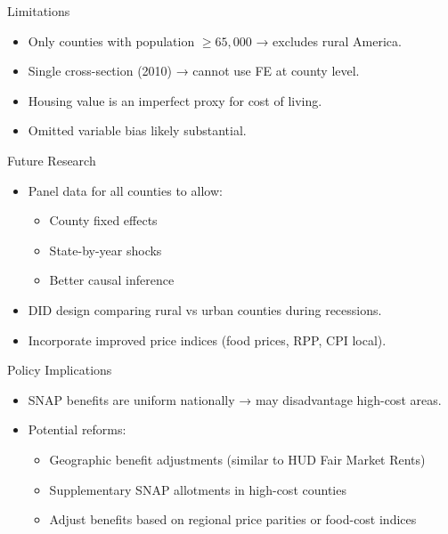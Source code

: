 \documentclass{beamer}
\begin{document}
\begin{frame}{Limitations}
\begin{itemize}
    \item Only counties with population $\geq 65,000$ → excludes rural America.
    \item Single cross-section (2010) → cannot use FE at county level.
    \item Housing value is an imperfect proxy for cost of living.
    \item Omitted variable bias likely substantial.
\end{itemize}
\end{frame}

\begin{frame}{Future Research}
\begin{itemize}
    \item Panel data for all counties to allow:
    \begin{itemize}
        \item County fixed effects
        \item State-by-year shocks
        \item Better causal inference
    \end{itemize}
    \item DID design comparing rural vs urban counties during recessions.
    \item Incorporate improved price indices (food prices, RPP, CPI local).
\end{itemize}
\end{frame}

\begin{frame}{Policy Implications}
\begin{itemize}
    \item SNAP benefits are uniform nationally → may disadvantage high-cost areas.
    \item Potential reforms:
    \begin{itemize}
        \item Geographic benefit adjustments (similar to HUD Fair Market Rents)
        \item Supplementary SNAP allotments in high-cost counties
        \item Adjust benefits based on regional price parities or food-cost indices
    \end{itemize}
\end{itemize}
\end{frame}
\end{document}
